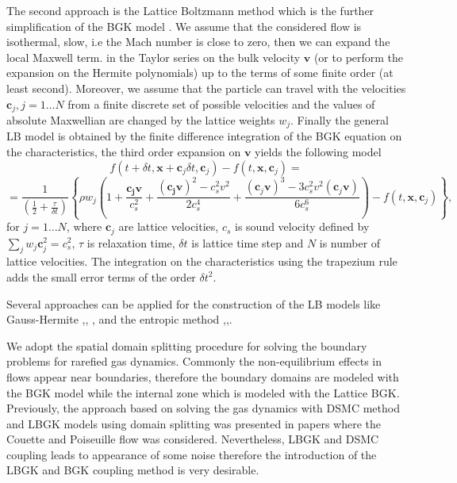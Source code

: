\documentclass[]{elsarticle} %
\begin{document}
{The  second  approach is  the  Lattice Boltzmann method which is the further simplification of the BGK model \cite{Succi2001}. We assume that the considered flow is isothermal,  slow,  i.e the  Mach number is  close  to zero, then we  can expand  the local Maxwell term.
in the Taylor series on the bulk velocity $\mathbf{v}$ (or to perform the expansion on the Hermite polynomials)  up to the terms of some finite order (at least second). Moreover, we assume that  the particle can travel with the  velocities $\mathbf{c}_{j}, j=1 \ldots N$ from a finite discrete set of possible velocities and  the values of absolute Maxwellian are  changed  by the lattice weights $w_j$.
Finally the general LB model is  obtained  by the finite difference integration of the BGK equation on the  characteristics,
the third order expansion on $\mathbf{v}$ yields the  following model
$$
f(t+\delta t, \mathbf{x}+\mathbf{c}_j\delta t, \mathbf{c}_j)-f(t, \mathbf{x},\mathbf{c}_j)=
$$
\begin{equation}\label{lbgk}
=\frac{1}{(\frac{1}{2}+\frac{\tau}{\delta t})}\left\{ \rho w_j\left(1+ \frac{\mathbf{c_j}\mathbf{v}}{c_s^2}+\frac{(\mathbf{c_j}\mathbf{v})^2-c_s^2v^2}{2c_s^4}
+\frac{(\mathbf{c}_j\mathbf{v})^3-3c_s^2 v^2(\mathbf{c}_j\mathbf{v})}{6c_s^6}\right)-f(t,\mathbf{x}, \mathbf{c}_j) \right \},
\end{equation}
for $j=1\ldots N$, where $\mathbf{c}_j$ are lattice velocities, $c_s$  is  sound velocity defined by $\sum_jw_j\mathbf{c}^2_j=c_s^2$, $\tau$  is  relaxation time, $\delta t$  is lattice  time step and  $N$  is number of lattice velocities.  The integration on  the  characteristics using the trapezium rule adds the small error terms of the  order  $\delta t^2$.


Several approaches can be applied for the  construction of the LB models like Gauss-Hermite \cite{he1997},\cite{shan1998}, \cite{Shan2006},\cite{shan2010} and the entropic  method \cite{karlin1999},\cite{chikatamarla2006},\cite{chikatamarla2009}.

We adopt the spatial domain splitting procedure  for solving  the  boundary problems  for  rarefied gas dynamics.
Commonly the  non-equilibrium effects in flows appear near boundaries, therefore the  boundary domains are modeled with the BGK model while the internal  zone which is modeled with the Lattice BGK. Previously, the  approach based on solving  the gas  dynamics with DSMC method and LBGK models using  domain splitting was presented in papers \cite{Staso2016short,Staso2016long,Staso2018} where  the Couette and  Poiseuille  flow  was  considered. Nevertheless, LBGK and DSMC coupling leads to appearance  of some  noise \cite{Succi2016} therefore the  introduction of the LBGK and  BGK coupling  method  is  very desirable.


}
\end{document}
